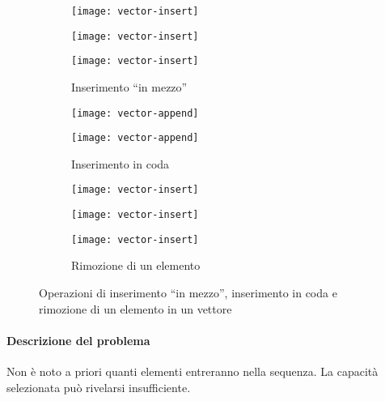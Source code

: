 \begin{figure}[!ht]
    \hfill
    \begin{subfigure}[b]{.3\linewidth}
        \texttt{[image: vector-insert]}
        
        \vspace{5pt}
        \texttt{[image: vector-insert]}

        \vspace{5pt}
        \texttt{[image: vector-insert]}
        \caption{Inserimento \enquote{in mezzo}}\label{fig:vector-insert}
    \end{subfigure}
    \hfill
    \begin{subfigure}[b]{.3\linewidth}
        \centering
        \texttt{[image: vector-append]}
        
        \vspace{5pt}
        \texttt{[image: vector-append]}

        \caption{Inserimento in coda}\label{fig:vector-append}
    \end{subfigure}
    \hfill
    \begin{subfigure}[b]{.3\linewidth}
        {
        \texttt{[image: vector-insert]}
        
        \vspace{5pt}
        \texttt{[image: vector-insert]}

        \vspace{5pt}
        \texttt{[image: vector-insert]}}
        \caption{Rimozione di un elemento}\label{fig:vector-insert}
    \end{subfigure}
    \hfill\null
    \caption{Operazioni di inserimento \enquote{in mezzo}, inserimento in coda e rimozione di un elemento in un vettore}
\end{figure}

\paragraph{Descrizione del problema}
Non è noto a priori quanti elementi entreranno nella sequenza.
La capacità selezionata può rivelarsi insufficiente.

